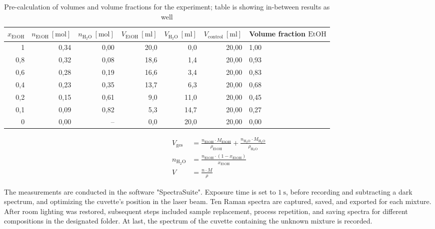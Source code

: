 \begin{table}[!htb]
    \centering
    \small
    \caption[Pre-calculation of volumes and volume fractions]{Pre-calculation of volumes and volume fractions for the experiment; table is showing in-between results as well}
    \label{tab:ethanol-conc}
    \vspace{12pt}
    \begin{tabularx}{\textwidth}{|r|r|r|r|r|r|X|}
        \hline 
        \rowcolor{lightgray} $x_\mathrm{EtOH}$ & $n_\mathrm{EtOH}~\mathrm{[mol]}$ & $n_\mathrm{H_2O}~\mathrm{[mol]}$ & $V_\mathrm{EtOH}~\mathrm{[ml]}$ & $V_\mathrm{H_2O}~\mathrm{[ml]}$ & $V_\mathrm{control}~\mathrm{[ml]}$ & Volume fraction $\mathrm{EtOH}$ \\ \hline \hline
        1	& 0,34 & 	0,00 & 	20,0 & 	 0,0 & 	20,00 & 	1,00  \\ \hline
        0,8	& 0,32 & 	0,08 & 	18,6 & 	 1,4 & 	20,00 & 	0,93  \\ \hline
        0,6	& 0,28 & 	0,19 & 	16,6 & 	 3,4 & 	20,00 & 	0,83  \\ \hline
        0,4	& 0,23 & 	0,35 & 	13,7 & 	 6,3 & 	20,00 & 	0,68  \\ \hline
        0,2	& 0,15 & 	0,61 & 	 9,0 & 	11,0 & 	20,00 & 	0,45  \\ \hline
        0,1	& 0,09 & 	0,82 & 	 5,3 & 	14,7 & 	20,00 & 	0,27  \\ \hline
        0	& 0,00 & 	--	 &   0,0 &  20,0 &  20,00 &  	0,00  \\ \hline

    \end{tabularx}
\end{table}

\begin{align}
    V_\mathrm{ges}&=\frac{n_\mathrm{EtOH} \cdot M_\mathrm{EtOH}}{\rho_\mathrm{EtOH}} + \frac{n_\mathrm{H_2O} \cdot M_\mathrm{H_2O}}{\rho_\mathrm{H_2O}} \label{eq:table-1}\\[6pt]
    n_\mathrm{H_2O}&=\frac{n_\mathrm{EtOH} \cdot (1-x_\mathrm{EtOH})}{x_\mathrm{EtOH}} \label{eq:table-2}\\[6pt]
    V&=\frac{n \cdot M}{\rho} \label{eq:table-3}
\end{align}

The measurements are conducted in the software "SpectraSuite". Exposure time is set to $1~\mathrm{s}$, before recording and subtracting a dark spectrum, and optimizing the cuvette's position in the laser beam. Ten Raman spectra are captured, saved, and exported for each mixture. After room lighting was restored, subsequent steps included sample replacement, process repetition, and saving spectra for different compositions in the designated folder. At last, the spectrum of the cuvette containing the unknown mixture is recorded.

